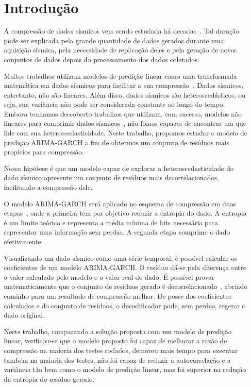 \chapter{Introdução}

A compressão de dados sísmicos vem sendo estudada há
decadas~\citep{Artigo:bordley1983}. Tal duração pode ser explicada pela grande
quantidade de dados gerados durante uma aquisição sísmica, pela necessidade de
replicação deles e pela geração de novos conjuntos de dados depois do
processamento dos dados coletados.

Muitos trabalhos utilizam modelos de predição linear como uma
transformada matemática em dados sísmicos para facilitar a sua
compressão~\citep{Artigo:bordley1983, Artigo:linearmelhor, Artigo:lpemaistres,
Artigo:nenhumamudanca}.
Dados sísmicos, entretanto, não são lineares. Além disso, dados sísmicos são
heteroscedásticos, ou seja, sua variância não pode ser considerada constante ao
longo do tempo. Embora tenhamos descoberto trabalhos que utilizam, com sucesso,
modelos não lineares para comprimir dados
sísmicos~\citep{Artigo:naolinearestat}, não fomos capazes de encontrar um que
lide com sua heteroscedasticidade. Neste trabalho, propomos estudar o modelo de
predição ARIMA-GARCH a fim de obtermos um conjunto de resíduos mais propícios
para compressão.

Nossa hipótese é que um modelo capaz de explorar a heteroscedasticidade do dado
sísmico apresente um conjunto de resíduos mais decorrelacionados, facilitando a
compressão dele.

O modelo ARIMA-GARCH será aplicado no esquema de compressão em duas
etapas~\citep{Artigo:stearnsincompleto}, onde a primeira tem por objetivo
reduzir a entropia do dado. A entropia é um limite teórico e representa a média
mínima de bits necessária para representar uma informação sem perdas. A segunda
etapa comprime o dado efetivamente.

Visualizando um dado sísmico como uma série temporal, é possível calcular os
coeficientes de um modelo ARIMA-GARCH. O resíduo dá-se pela diferença entre o
valor calculado pelo modelo e o valor real do dado. É possível provar
matematicamente que o conjunto de resíduos gerado é
decorrelacionado~\citep{Livro:analiseseriestemporais}, abrindo caminho para um
resultado de compressão melhor. De posse dos coeficientes calculados e do
conjunto de resíduos, o decodificador pode, sem perdas, regerar o dado original.

Neste trabalho, comparando a solução proposta com um modelo de
predição linear, verificou-se que o modelo proposto foi capaz de melhorar a
razão de compressão na maioria dos testes rodados, demorou mais tempo para
executar também na maioria dos testes, não foi capaz de reduzir a autocorrelação
e a variância tão bem como o modelo de predição linear, mas foi superior na
redução da entropia do resíduo gerado.

